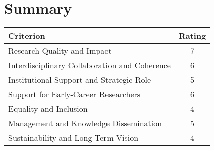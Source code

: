 \documentclass{article}
\begin{document}
\section{Summary}
\begin{center}
\begin{tabular}{|l|c|}
    \hline
    \textbf{Criterion} & \textbf{Rating} \\
    \hline
    Research Quality and Impact & 7 \\
    Interdisciplinary Collaboration and Coherence & 6 \\
    Institutional Support and Strategic Role & 5 \\
    Support for Early-Career Researchers & 6 \\
    Equality and Inclusion & 4 \\
    Management and Knowledge Dissemination & 5 \\
    Sustainability and Long-Term Vision & 4 \\
    \hline
\end{tabular}
\end{center}
\end{document}

